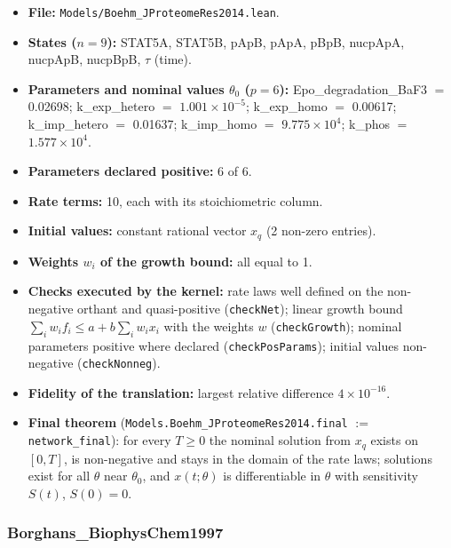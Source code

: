 \begin{itemize}\itemsep0pt\small
\item \textbf{File:} \texttt{Models/Boehm\_JProteomeRes2014.lean}.
\item \textbf{States ($n=9$):} STAT5A, STAT5B, pApB, pApA, pBpB, nucpApA, nucpApB, nucpBpB, $\tau$ (time).
\item \textbf{Parameters and nominal values $\theta_0$ ($p=6$):} Epo\_degradation\_BaF3 $=$ 0.02698; k\_exp\_hetero $=$ $1.001\times10^{-5}$; k\_exp\_homo $=$ 0.00617; k\_imp\_hetero $=$ 0.01637; k\_imp\_homo $=$ $9.775\times10^{4}$; k\_phos $=$ $1.577\times10^{4}$.
\item \textbf{Parameters declared positive:} 6 of 6.
\item \textbf{Rate terms:} 10, each with its stoichiometric column.
\item \textbf{Initial values:} constant rational vector $x_q$ (2 non-zero entries).
\item \textbf{Weights $w_i$ of the growth bound:} all equal to 1.
\item \textbf{Checks executed by the kernel:} rate laws well defined on the non-negative orthant and quasi-positive (\texttt{checkNet}); linear growth bound $\sum_iw_if_i\le a+b\sum_iw_ix_i$ with the weights $w$ (\texttt{checkGrowth}); nominal parameters positive where declared (\texttt{checkPosParams}); initial values non-negative (\texttt{checkNonneg}).
\item \textbf{Fidelity of the translation:} largest relative difference $4\times10^{-16}$.
\item \textbf{Final theorem} (\texttt{Models.Boehm\_JProteomeRes2014.final} $:=$ \texttt{network\_final}): for every $T\ge0$ the nominal solution from $x_q$ exists on $[0,T]$, is non-negative and stays in the domain of the rate laws; solutions exist for all $\theta$ near $\theta_0$, and $x(t;\theta)$ is differentiable in $\theta$ with sensitivity $S(t)$, $S(0)=0$.
\end{itemize}

\subsubsection*{Borghans\_BiophysChem1997}

